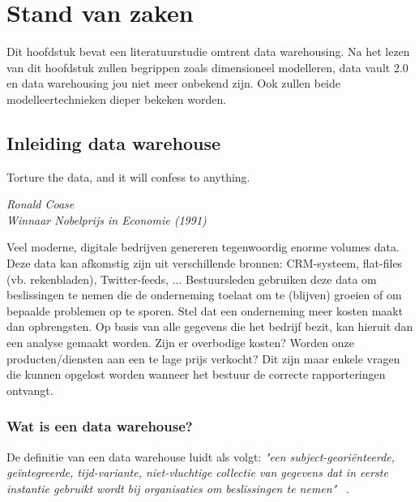 \chapter{Stand van zaken}
\label{ch:stand-van-zaken}



Dit hoofdstuk bevat een literatuurstudie omtrent data warehousing. Na het lezen van dit hoofdstuk zullen begrippen zoals dimensioneel modelleren, data vault 2.0 en data warehousing jou niet meer onbekend zijn. Ook zullen beide modelleertechnieken dieper bekeken worden.

\section{Inleiding data warehouse}

\epigraph{Torture the data, and it will confess to anything. }{\textit{Ronald Coase \\ Winnaar Nobelprijs in Economie (1991)}}

Veel moderne, digitale bedrijven genereren tegenwoordig enorme volumes data. Deze data kan afkomstig zijn uit verschillende bronnen: CRM-systeem, flat-files (vb. rekenbladen), Twitter-feeds, ... Bestuursleden gebruiken deze data om beslissingen te nemen die de onderneming toelaat om te (blijven) groeien of om bepaalde problemen op te sporen. Stel dat een onderneming meer kosten maakt dan opbrengsten. Op basis van alle gegevens die het bedrijf bezit, kan hieruit dan een analyse gemaakt worden. Zijn er overbodige kosten? Worden onze producten/diensten aan een te lage prijs verkocht? Dit zijn maar enkele vragen die kunnen opgelost worden wanneer het bestuur de correcte rapporteringen ontvangt. 

\subsection{Wat is een data warehouse?}
De definitie van een data warehouse luidt als volgt: \textit{"een subject-georiënteerde, geïntegreerde, tijd-variante, niet-vluchtige collectie van gegevens dat in eerste instantie gebruikt wordt bij organisaties om beslissingen te nemen"} ~\autocite{Panos2000}.

